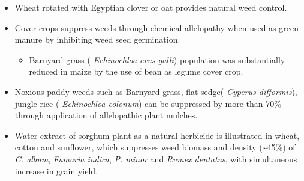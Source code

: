 \documentclass[11pt,dvipsnames,ignorenonframetext,aspectratio=169]{beamer}
\providecommand{\tightlist}{%
  \setlength{\itemsep}{0pt}\setlength{\parskip}{0pt}}
\begin{document}
\begin{frame}{}
\protect\hypertarget{section-11}{}
\small

\begin{itemize}
\tightlist
\item
  Wheat rotated with Egyptian clover or oat provides natural weed
  control.
\item
  Cover crops suppress weeds through chemical allelopathy when used as
  green manure by inhibiting weed seed germination.

  \begin{itemize}
  \tightlist
  \item
    Barnyard grass ( \emph{Echinochloa crus-galli}) population was
    substantially reduced in maize by the use of bean as legume cover
    crop.
  \end{itemize}
\item
  Noxious paddy weeds such as Barnyard grass, flat sedge( \emph{Cyperus
  difformis}), jungle rice ( \emph{Echinochloa colonum}) can be
  suppressed by more than 70\% through application of allelopathic plant
  mulches.
\item
  Water extract of sorghum plant as a natural herbicide is illustrated
  in wheat, cotton and sunflower, which suppresses weed biomass and
  density (\textasciitilde45\%) of \emph{C. album}, \emph{Fumaria
  indica}, \emph{P. minor} and \emph{Rumex dentatus}, with simultaneous
  increase in grain yield.
\end{itemize}
\end{frame}
\end{document}
